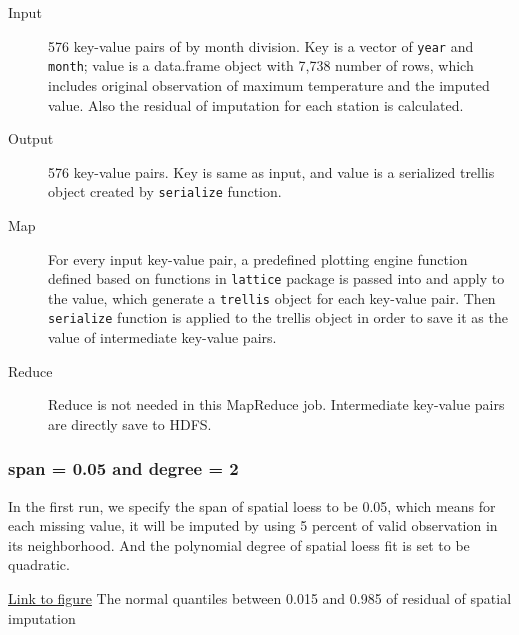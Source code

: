 \begin{description}
  \item[Input] 576 key-value pairs of by month division. Key is a vector of
  \texttt{year} and \texttt{month}; value is a data.frame object with 7,738 
  number of rows, which includes original observation of maximum temperature
  and the imputed value. Also the residual of imputation for each station is 
  calculated.
  \item[Output] 576 key-value pairs. Key is same as input, and value is a serialized
  trellis object created by \texttt{serialize} function.
  \item[Map]For every input key-value pair, a predefined plotting engine function
  defined based on functions in \texttt{lattice} package is passed into and apply 
  to the value, which generate a \texttt{trellis} object for each key-value pair. 
  Then \texttt{serialize} function is applied to the trellis object in order to 
  save it as the value of intermediate key-value pairs.
  \item[Reduce] Reduce is not needed in this MapReduce job. Intermediate key-value
  pairs are directly save to HDFS.
\end{description}

\subsubsection{span = 0.05 and degree = 2}

In the first run, we specify the span of spatial loess to be 0.05, which means
for each missing value, it will be imputed by using 5 percent of valid observation
in its neighborhood. And the polynomial degree of spatial loess fit is set to be
quadratic.

\begin{framed}
\begin{center}
  \href{../plots/a1950/spaimpute/nonelev/span0.05/a1950.spaResidcenter.bytime.pdf}
  {Link to figure}
  {The normal quantiles between 0.015 and 0.985 of residual of spatial imputation}
  \label{nonelev.0.05.Residcenter.bytime}
\end{center}
\end{framed}

